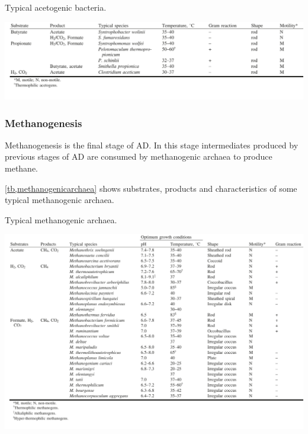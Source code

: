 \documentclass[fontsize=12pt,headsepline=true, bibliography=totocnumbered, twoside]{scrbook} %
\begin{document}
\begin{table}
\center
\caption[Typical acetogenic bacteria]{Typical acetogenic bacteria.\citep{amani2010anaerobic}}
\vspace{0.3cm}
\includegraphics[scale=0.73]{acetogenicbacteria}
\label{tb,acetogenicbacteria}
\end{table}



\subsubsection{Methanogenesis}

Methanogenesis is the final stage of \ac{AD}. In this stage intermediates produced by previous stages of \ac{AD} are consumed by methanogenic archaea to produce methane\citep{patel}.

\autoref{tb,methanogenicarchaea} shows substrates, products and characteristics of some typical methanogenic archaea.



\begin{table}
\center
\caption[Typical methanogenic archaea]{Typical methanogenic archaea.\citep{amani2010anaerobic}}
\vspace{0.3cm}
\includegraphics[scale=0.66]{methanogenicarchaea}
\label{tb,methanogenicarchaea}
\end{table}
\end{document}
